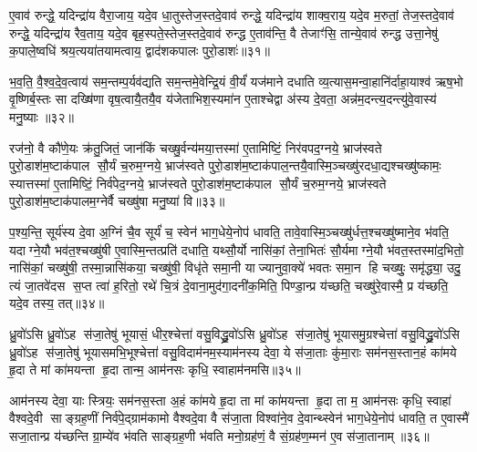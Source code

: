 ए॒वाव॑ रुन्द्धे॒ यदिन्द्रा॑य वैरा॒जाय॒ यदे॒व धा॒तुस्तेज॒स्तदे॒वाव॑ रुन्द्धे॒ यदिन्द्रा॑य शाक्व॒राय॒ यदे॒व म॒रुतां॒ तेज॒स्तदे॒वाव॑ रुन्द्धे॒ यदिन्द्रा॑य रैव॒ताय॒ यदे॒व बृह॒स्पते॒स्तेज॒स्तदे॒वाव॑ रुन्द्ध ए॒ताव॑न्ति॒ वै तेजाꣳ॑सि॒ तान्ये॒वाव॑ रुन्द्ध उत्ता॒नेषु॑ क॒पाले॒ष्वधि॑ श्रय॒त्यया॑तयामत्वाय॒ द्वाद॑शकपालः पुरो॒डाशः॑॥३१॥

भ॒व॒ति॒ वै॒श्व॒दे॒व॒त्वाय॑ सम॒न्तम्प॒र्यव॑द्यति सम॒न्तमे॒वेन्द्रि॒यं वी॒र्यं॑ यज॑माने दधाति व्य॒त्यास॒मन्वा॒हानि॑र्दाहा॒याश्व॑ ऋष॒भो वृ॒ष्णिर्ब॒स्तः सा दख्षि॑णा वृष॒त्वायै॒तयै॒व य॑जेताभिश॒स्यमा॑न ए॒ताश्चेद्वा अ॑स्य दे॒वता॒ अन्न॑म॒दन्त्य॒दन्त्यु॑वे॒वास्य॑ मनु॒ष्याः॥३२॥

{\anuvakamend[{इ॒न्द्रि॒यका॑मस्सवि॒तुस्तेज॒स्तत्पु॑रो॒डाशो॒ऽष्टात्रिꣳ॑शच्च॥७॥}]}

रज॑नो॒ वै कौ॑णे॒यः क्र॑तु॒जितं॒ जान॑किं चख्षु॒र्वन्य॑मया॒त्तस्मा॑ ए॒तामिष्टिं॒ निर॑वपद॒ग्नये॒ भ्राज॑स्वते पुरो॒डाश॑म॒ष्टाक॑पाल सौ॒र्यं च॒रुम॒ग्नये॒ भ्राज॑स्वते पुरो॒डाश॑म॒ष्टाक॑पाल॒न्तयै॒वास्मि॒ञ्चख्षु॑रदधा॒द्यश्चख्षु॑ष्कामः॒ स्यात्तस्मा॑ ए॒तामिष्टिं॒ निर्व॑पेद॒ग्नये॒ भ्राज॑स्वते पुरो॒डाश॑म॒ष्टाक॑पाल सौ॒र्यं च॒रुम॒ग्नये॒ भ्राज॑स्वते पुरो॒डाश॑म॒ष्टाक॑पालम॒ग्नेर्वै चख्षु॑षा मनु॒ष्या॑ वि॥३३॥

प॒श्य॒न्ति॒ सूर्य॑स्य दे॒वा अ॒ग्निं चै॒व सूर्यं॑ च॒ स्वेन॑ भाग॒धेये॒नोप॑ धावति॒ तावे॒वास्मि॒ञ्चख्षु॑र्धत्त॒श्चख्षु॑ष्माने॒व भ॑वति॒ यदाग्ने॒यौ भव॑त॒श्चख्षु॑षी ए॒वास्मि॒न्तत्प्रति॑ दधाति॒ यथ्सौ॒र्यो नासि॑कां॒ तेना॒भितः॑ सौ॒र्यमाग्ने॒यौ भ॑वत॒स्तस्मा॑द॒भितो॒ नासि॑कां॒ चख्षु॑षी॒ तस्मा॒न्नासि॑कया॒ चख्षु॑षी॒ विधृ॑ते समा॒नी याज्यानुवा॒क्ये॑ भवतः समा॒न हि चख्षुः॒ समृ॑द्ध्या॒ उदु॒ त्यं जा॒तवे॑दस स॒प्त त्वा॑ ह॒रितो॒ रथे॑ चि॒त्रं दे॒वाना॒मुद॑गा॒दनी॑क॒मिति॒ पिण्डा॒न्प्र य॑च्छति॒ चख्षु॑रे॒वास्मै॒ प्र य॑च्छति॒ यदे॒व तस्य॒ तत्॥३४॥

{\anuvakamend[{वि ह्य॑ष्टाविꣳ॑शतिश्च॥८॥}]}

ध्रु॒वो॑ऽसि ध्रु॒वो॑ऽह स॑जा॒तेषु॑ भूयासं॒ धीर॒श्चेत्ता॑ वसु॒विद्ध्रु॒वो॑ऽसि ध्रु॒वो॑ऽह स॑जा॒तेषु॑ भूयासमु॒ग्रश्चेत्ता॑ वसु॒विद्ध्रु॒वो॑ऽसि ध्रु॒वो॑ऽह स॑जा॒तेषु॑ भूयासमभि॒भूश्चेत्ता॑ वसु॒विदाम॑नम॒स्याम॑नस्य देवा॒ ये स॑जा॒ताः कु॑मा॒राः सम॑नस॒स्तान॒हं का॑मये हृ॒दा ते मां का॑मयन्ता हृ॒दा तान्म॒ आम॑नसः कृधि॒ स्वाहाम॑नमसि॥३५॥

आम॑नस्य देवा॒ याः स्त्रियः॒ सम॑नस॒स्ता अ॒हं का॑मये हृ॒दा ता मां का॑मयन्ता हृ॒दा ता म॒ आम॑नसः कृधि॒ स्वाहा॑ वैश्वदे॒वी साङ्ग्रह॒णीं निर्व॑पे॒द्ग्राम॑कामो वैश्वदे॒वा वै स॑जा॒ता विश्वा॑ने॒व दे॒वान्थ्स्वेन॑ भाग॒धेये॒नोप॑ धावति॒ त ए॒वास्मै॑ सजा॒तान्प्र य॑च्छन्ति ग्रा॒म्ये॑व भ॑वति साङ्ग्रह॒णी भ॑वति मनो॒ग्रह॑णं॒ वै सं॒ग्रह॑ण॒म्मन॑ ए॒व स॑जा॒तानाम्॥३६॥

